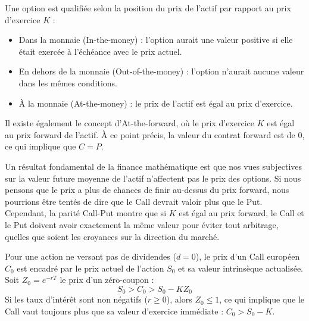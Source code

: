 \begin{definitionbox}
Une option est qualifiée selon la position du prix de l'actif par rapport au prix d'exercice $K$ :
\begin{itemize}[label=$\rightarrow$]
    \item Dans la monnaie (In-the-money) : l'option aurait une valeur positive si elle était exercée à l'échéance avec le prix actuel.
    \item En dehors de la monnaie (Out-of-the-money) : l'option n'aurait aucune valeur dans les mêmes conditions.
    \item À la monnaie (At-the-money) : le prix de l'actif est égal au prix d'exercice.
\end{itemize}
Il existe également le concept d'At-the-forward, où le prix d'exercice $K$ est égal au prix forward de l'actif. À ce point précis, la valeur du contrat forward est de $0$, ce qui implique que $C = P$.
\end{definitionbox}

Un résultat fondamental de la finance mathématique est que nos vues subjectives sur la valeur future moyenne de l'actif n'affectent pas le prix des options. Si nous pensons que le prix a plus de chances de finir au-dessus du prix forward, nous pourrions être tentés de dire que le Call devrait valoir plus que le Put. Cependant, la parité Call-Put montre que si $K$ est égal au prix forward, le Call et le Put doivent avoir exactement la même valeur pour éviter tout arbitrage, quelles que soient les croyances sur la direction du marché.

\begin{theorembox}
Pour une action ne versant pas de dividendes ($d = 0$), le prix d'un Call européen $C_0$ est encadré par le prix actuel de l'action $S_0$ et sa valeur intrinsèque actualisée. Soit $Z_0 = e^{-rT}$ le prix d'un zéro-coupon :
\begin{equation}
    \label{eq:fsec2-bornes_call}
    S_0 > C_0 > S_0 - K Z_0
\end{equation}
Si les taux d'intérêt sont non négatifs ($r \geq 0$), alors $Z_0 \leq 1$, ce qui implique que le Call vaut toujours plus que sa valeur d'exercice immédiate : $C_0 > S_0 - K$.
\end{theorembox}


